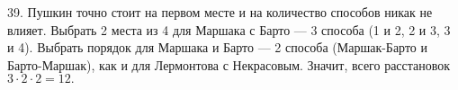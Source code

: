 39. Пушкин точно стоит на первом месте и на количество способов никак не влияет. Выбрать 2 места из 4 для Маршака с Барто --- 3 способа (1 и 2, 2 и 3, 3 и 4). Выбрать порядок для Маршака и Барто --- 2 способа (Маршак-Барто и Барто-Маршак), как и для  Лермонтова с Некрасовым. Значит, всего расстановок $3\cdot2\cdot2=12.$\\
